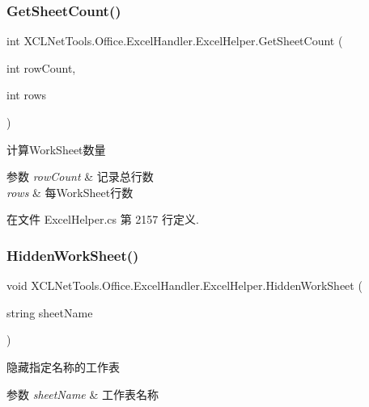 \subsubsection{\texorpdfstring{Get\+Sheet\+Count()}{GetSheetCount()}}
{\footnotesize\ttfamily int X\+C\+L\+Net\+Tools.\+Office.\+Excel\+Handler.\+Excel\+Helper.\+Get\+Sheet\+Count (\begin{DoxyParamCaption}\item[{int}]{row\+Count,  }\item[{int}]{rows }\end{DoxyParamCaption})}



计算\+Work\+Sheet数量 


\begin{DoxyParams}{参数}
{\em row\+Count} & 记录总行数\\
\hline
{\em rows} & 每\+Work\+Sheet行数\\
\hline
\end{DoxyParams}


在文件 Excel\+Helper.\+cs 第 2157 行定义.

\mbox{\label{class_x_c_l_net_tools_1_1_office_1_1_excel_handler_1_1_excel_helper_a9aaab80ccb46c62132165fd20790e3d0}} 
\subsubsection{\texorpdfstring{Hidden\+Work\+Sheet()}{HiddenWorkSheet()}\hspace{0.1cm}{\footnotesize\ttfamily [1/2]}}
{\footnotesize\ttfamily void X\+C\+L\+Net\+Tools.\+Office.\+Excel\+Handler.\+Excel\+Helper.\+Hidden\+Work\+Sheet (\begin{DoxyParamCaption}\item[{string}]{sheet\+Name }\end{DoxyParamCaption})}



隐藏指定名称的工作表 


\begin{DoxyParams}{参数}
{\em sheet\+Name} & 工作表名称\\
\hline
\end{DoxyParams}


